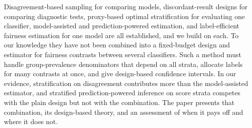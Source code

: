 Disagreement-based sampling for comparing models, discordant-result designs for comparing diagnostic tests, proxy-based optimal stratification for evaluating one classifier, model-assisted and prediction-powered estimation, and label-efficient fairness estimation for one model are all established, and we build on each. To our knowledge they have not been combined into a fixed-budget design and estimator for fairness contrasts between several classifiers. Such a method must handle group-prevalence denominators that depend on all strata, allocate labels for many contrasts at once, and give design-based confidence intervals. In our evidence, stratification on disagreement contributes more than the model-assisted estimator, and stratified prediction-powered inference on score strata competes with the plain design but not with the combination. The paper presents that combination, its design-based theory, and an assessment of when it pays off and where it does not.
